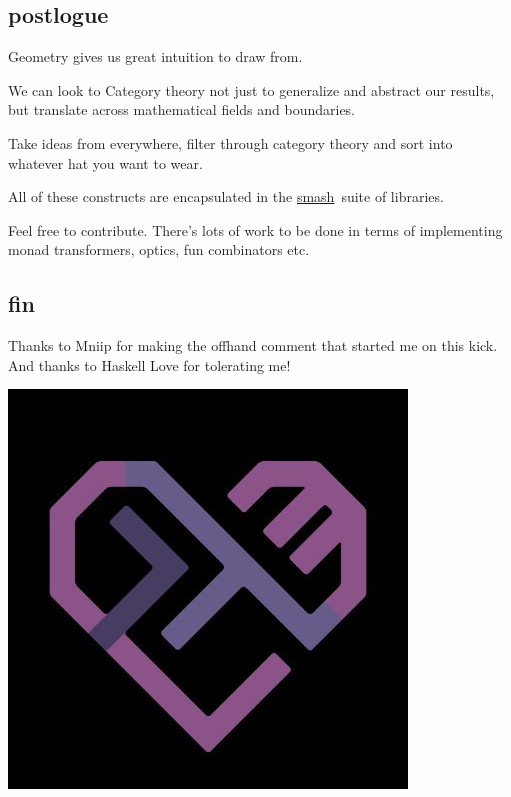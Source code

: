 \documentclass[tikz]{beamer}
\theoremstyle{definition}
\begin{document}
\subsection{postlogue}
\frame
{
	Geometry gives us great intuition to draw from.
}

\frame
{
	We can look to Category theory not just to generalize and abstract our results, but translate across mathematical fields and boundaries. 
}

\frame
{
	Take ideas from everywhere, filter through category theory and sort into whatever hat you want to wear.
}

\frame
{
	All of these constructs are encapsulated in the \href{https://github.com/emilypi/smash}{smash} suite of libraries. 
}

\frame
{
	Feel free to contribute. There's lots of work to be done in terms of implementing monad transformers, optics, fun combinators etc. 
}

\subsection{fin}
\frame
{
	Thanks to Mniip for making the offhand comment that started me on this kick. And thanks to Haskell Love for tolerating me!
	\newline
	\begin{center}
		\includegraphics[scale=0.35]{haskell_love}
	\end{center}
	 
}
\end{document}
